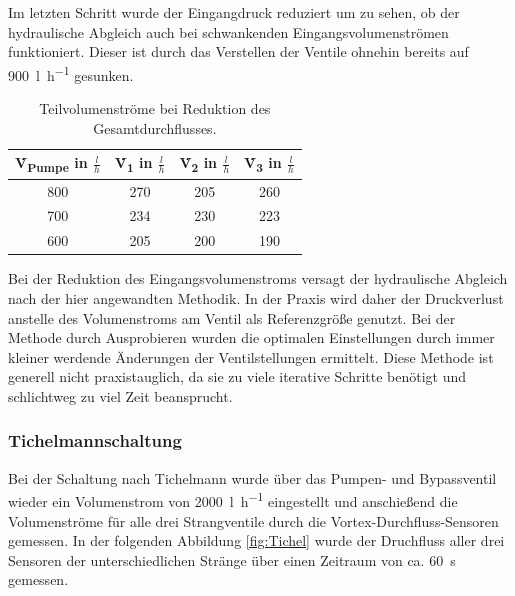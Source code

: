 Im letzten Schritt wurde der Eingangdruck reduziert um zu sehen, ob der hydraulische Abgleich auch bei schwankenden Eingangsvolumenströmen funktioniert. Dieser ist durch das Verstellen der Ventile ohnehin bereits auf \SI{900}{\litre\per\hour} gesunken.

\begin{table}[H]
	\centering
	\caption{Teilvolumenströme bei Reduktion des Gesamtdurchflusses.}
	\begin{tabular}{cccc}
		\label{tab:komp2}
		
		\textbf{\.V\textsubscript{Pumpe}} in $\frac{l}{h}$ & \textbf{\.V\textsubscript{1}} in $\frac{l}{h}$ & \textbf{\.V\textsubscript{2}} in $\frac{l}{h}$ & \textbf{\.V\textsubscript{3}} in $\frac{l}{h}$\\
		\hline
		800 & 270 & 205 & 260\\
		700 & 234 & 230 & 223\\
		600 & 205 & 200 & 190\\
	\end{tabular}
\end{table}

Bei der Reduktion des Eingangsvolumenstroms versagt der hydraulische Abgleich nach der hier angewandten Methodik. In der Praxis wird daher der Druckverlust anstelle des Volumenstroms am Ventil als Referenzgröße genutzt. Bei der Methode durch Ausprobieren wurden die optimalen Einstellungen durch immer kleiner werdende Änderungen der Ventilstellungen ermittelt. Diese Methode ist generell nicht praxistauglich, da sie zu viele iterative Schritte benötigt und schlichtweg zu viel Zeit beansprucht.

\subsubsection{Tichelmannschaltung}

Bei der Schaltung nach Tichelmann wurde über das Pumpen- und Bypassventil wieder ein Volumenstrom von \SI{2000}{\litre\per\hour} eingestellt und anschießend die Volumenströme für alle drei Strangventile durch die Vortex-Durchfluss-Sensoren gemessen. In der folgenden Abbildung \ref{fig:Tichel} wurde der Druchfluss aller drei Sensoren der unterschiedlichen Stränge über einen Zeitraum von ca. \SI{60}{\second} gemessen.

